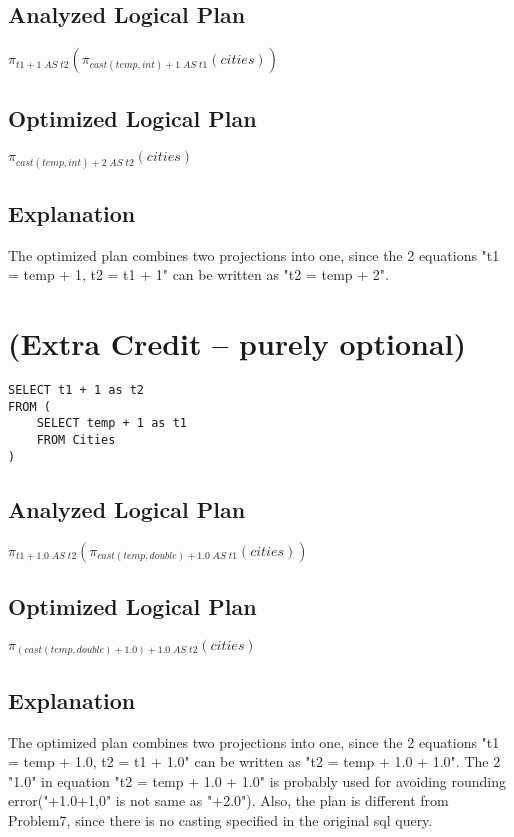 \documentclass[12pt]{article}
\begin{document}
\subsection*{Analyzed Logical Plan}
$\pi_{t1 + 1 \; AS \; t2}(\pi_{cast(temp,int) + 1 \; AS \; t1}(cities))$

\subsection*{Optimized Logical Plan}
$\pi_{cast(temp,int) + 2 \; AS \; t2}(cities)$

\subsection*{Explanation}
The optimized plan combines two projections into one, since the 2 equations "t1 = temp + 1, t2 = t1 + 1" can be written as "t2 = temp + 2".

\newpage

\section{(Extra Credit -- purely optional)}
\begin{verbatim}
SELECT t1 + 1 as t2
FROM (
    SELECT temp + 1 as t1
    FROM Cities
)
\end{verbatim}

\subsection*{Analyzed Logical Plan}
$\pi_{t1 + 1.0 \; AS \; t2}(\pi_{cast(temp,double) + 1.0 \; AS \; t1}(cities))$

\subsection*{Optimized Logical Plan}
$\pi_{(cast(temp,double) + 1.0) + 1.0 \; AS \; t2}(cities)$

\subsection*{Explanation}
The optimized plan combines two projections into one, since the 2 equations "t1 = temp + 1.0, t2 = t1 + 1.0" can be written as "t2 = temp + 1.0 + 1.0". The 2 "1.0" in equation "t2 = temp + 1.0 + 1.0" is probably used for avoiding rounding error("+1.0+1,0" is not same as "+2.0"). Also, the plan is different from Problem7, since there is no casting specified in the original sql query.
\end{document}
